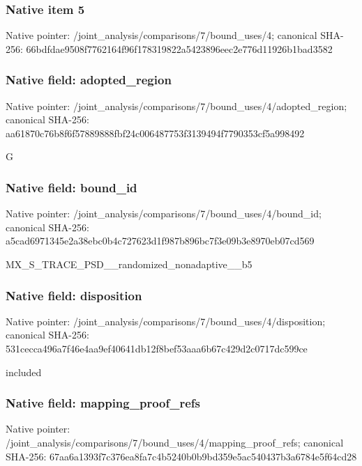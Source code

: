 \documentclass[10pt,a4paper]{article}
\begin{document}
\subsubsection{Native item 5}
Native pointer: /joint\_\allowbreak{}analysis/comparisons/7/bound\_\allowbreak{}uses/4; canonical SHA-256: 66bdfdae9508f7762164f96f178319822a5423896eec2e776d11926b1bad3582

\subsubsection{Native field: adopted\_\allowbreak{}region}
Native pointer: /joint\_\allowbreak{}analysis/comparisons/7/bound\_\allowbreak{}uses/4/adopted\_\allowbreak{}region; canonical SHA-256: aa61870c76b8f6f57889888fbf24c006487753f3139494f7790353cf5a998492

\begingroup\raggedright\sloppy G\par\endgroup

\subsubsection{Native field: bound\_\allowbreak{}id}
Native pointer: /joint\_\allowbreak{}analysis/comparisons/7/bound\_\allowbreak{}uses/4/bound\_\allowbreak{}id; canonical SHA-256: a5cad6971345e2a38ebc0b4c727623d1f987b896bc7f3e09b3e8970eb07cd569

\begingroup\raggedright\sloppy MX\_\allowbreak{}S\_\allowbreak{}TRACE\_\allowbreak{}PSD\_\allowbreak{}\_\allowbreak{}randomized\_\allowbreak{}nonadaptive\_\allowbreak{}\_\allowbreak{}b5\par\endgroup

\subsubsection{Native field: disposition}
Native pointer: /joint\_\allowbreak{}analysis/comparisons/7/bound\_\allowbreak{}uses/4/disposition; canonical SHA-256: 531cecca496a7f46e4aa9ef40641db12f8bef53aaa6b67c429d2c0717dc599ce

\begingroup\raggedright\sloppy included\par\endgroup

\subsubsection{Native field: mapping\_\allowbreak{}proof\_\allowbreak{}refs}
Native pointer: /joint\_\allowbreak{}analysis/comparisons/7/bound\_\allowbreak{}uses/4/mapping\_\allowbreak{}proof\_\allowbreak{}refs; canonical SHA-256: 67aa6a1393f7c376ea8fa7c4b5240b0b9bd359e5ac540437b3a6784e5f64cd28
\end{document}
